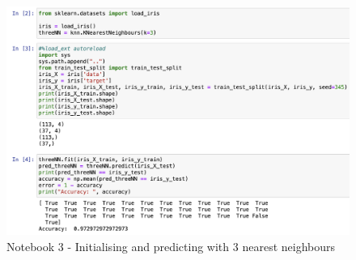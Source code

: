 \documentclass[letterpaper,10pt]{article}
\begin{document}
\begin{figure}[ht]
    \centering
    \includegraphics[width=1\textwidth]{3NNjupy.png}
    \caption{Notebook 3 - Initialising and predicting with 3 nearest neighbours}
    \label{fig:3nnjupy}
\end{figure}
\end{document}
